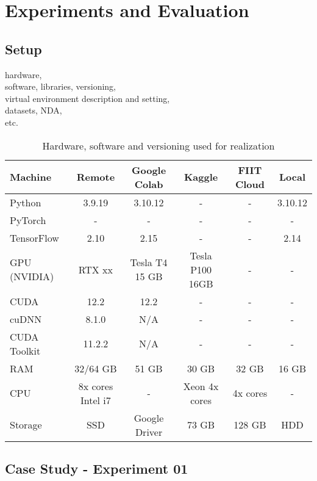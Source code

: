 \chapter{Experiments and Evaluation}
\label{chapter:experiments-and-evaluation}

\section{Setup}
\label{sec:exp-setup}

hardware, \\
software, libraries, versioning, \\
virtual environment description and setting, \\
datasets, NDA, \\
etc.


\begin{table}[h!]
    \centering
    \begin{tabular}{lccccc}
    \toprule
Machine & Remote    & Google Colab  & Kaggle    & FIIT Cloud    & Local    \\ 
    \midrule
Python      & 3.9.19        & 3.10.12        & - & -    & 3.10.12        \\
PyTorch     & -             & -              & - & -    & -              \\
TensorFlow  & 2.10          & 2.15           & - & -    & 2.14           \\
GPU (NVIDIA) & RTX xx & Tesla T4 15 GB & Tesla P100 16GB & - & -      \\
CUDA        & 12.2          & 12.2           & - & -    & -              \\
cuDNN       & 8.1.0         & N/A            & - & -    & -              \\
CUDA Toolkit & 11.2.2       & N/A            & - & -    & -              \\ 
RAM    & 32/64 GB        & 51 GB & 30 GB     & 32 GB    & 16 GB         \\
CPU  & 8x cores Intel i7   & -  & Xeon 4x cores & 4x cores & -              \\
Storage    & SSD  & Google Driver  & 73 GB & 128 GB & HDD            \\
    \bottomrule
    \end{tabular}
    \caption{Hardware, software and versioning used for realization}
    \label{table:experiments_environment}
\end{table}


\section{Case Study - Experiment 01}
